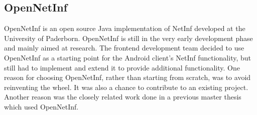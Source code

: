 \subsection{OpenNetInf}
OpenNetInf \cite{opennetinf} is an open source Java implementation of NetInf
 developed at the University of Paderborn. OpenNetInf is still in the very
 early development phase and mainly aimed at research. The frontend development
 team decided to use OpenNetInf as a starting point for the Android client's
 NetInf functionality, but still had to implement and extend it to provide additional functionality. One reason for choosing OpenNetInf, rather than 
starting from scratch, was to avoid reinventing the wheel. It was also a 
chance to contribute to an existing project. Another reason was the closely
 related work done in a previous master thesis \cite{hugomiguel} which used 
OpenNetInf.
